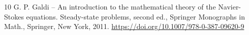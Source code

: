 \begin{thebibliography}{10}
 G. P. Galdi – An introduction to the mathematical theory of the Navier-Stokes equations. Steady-state problems, second ed., Springer Monographs in Math., Springer, New York, 2011. \url{https://doi.org/10.1007/978-0-387-09620-9}
\end{thebibliography}
